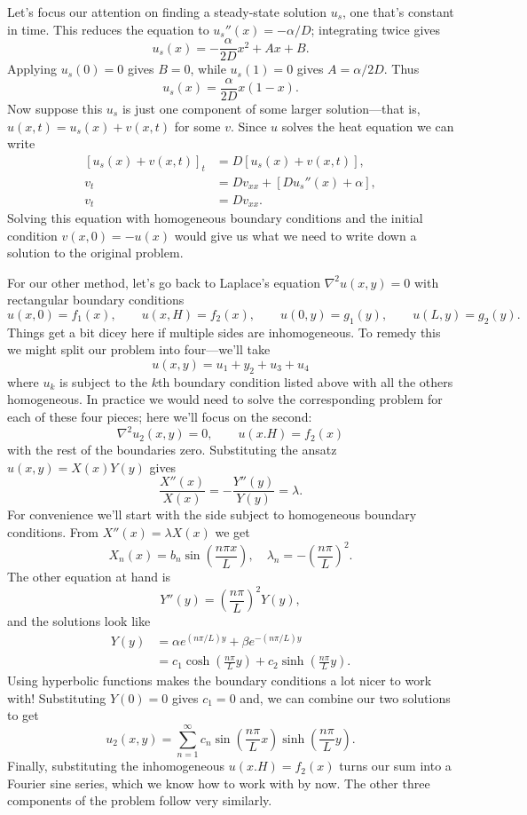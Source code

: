 \documentclass[../m180main.tex]{subfiles}
\begin{document}
Let's focus our attention on finding a steady-state solution $u_s$, one that's constant in time.
This reduces the equation to $u_s''(x) = -\alpha / D$; integrating twice gives
\[ u_s(x) = -\frac{\alpha}{2D} x^2 + Ax + B. \]
Applying $u_s(0) = 0$ gives $B = 0$, while $u_s(1) = 0$ gives $A = \alpha / 2D$.
Thus
\[ u_s(x) = \frac{\alpha}{2D} x(1-x). \]
Now suppose this $u_s$ is just one component of some larger solution---that is, $u(x,t) = u_s(x) + v(x,t)$ for some $v$.
Since $u$ solves the heat equation we can write
\begin{align*}
    \left[ u_s(x) + v(x,t) \right]_t &= D \left[ u_s(x) + v(x,t) \right], \\
    v_t &= D v_{xx} + \left[ D u_s''(x) + \alpha \right], \\
    v_t &= D v_{xx}.
\end{align*}
Solving this equation with homogeneous boundary conditions and the initial condition $v(x,0) = -u(x)$ would give us what we need to write down a solution to the original problem.

For our other method, let's go back to Laplace's equation $\nabla^2 u(x,y) = 0$ with rectangular boundary conditions
\[ u(x,0) = f_1(x), \qquad u(x,H) = f_2(x), \qquad u(0,y) = g_1(y), \qquad u(L,y) = g_2(y). \]
Things get a bit dicey here if multiple sides are inhomogeneous.
To remedy this we might split our problem into four---we'll take
\[ u(x,y) = u_1 + y_2 + u_3 + u_4 \]
where $u_k$ is subject to the $k$th boundary condition listed above with all the others homogeneous.
In practice we would need to solve the corresponding problem for each of these four pieces; here we'll focus on the second:
\[ \nabla^2 u_2(x,y) = 0, \qquad u(x.H) = f_2(x) \]
with the rest of the boundaries zero.
Substituting the ansatz $u(x,y) = X(x) Y(y)$ gives
\[ \frac{X''(x)}{X(x)} = -\frac{Y''(y)}{Y(y)} = \lambda. \]
For convenience we'll start with the side subject to homogeneous boundary conditions.
From $X''(x) = \lambda X(x)$ we get
\[ X_n(x) = b_n \sin \left( \frac{n\pi x}{L} \right), \quad \lambda_n = - \left( \frac{n\pi}{L} \right)^2. \]
The other equation at hand is
\[ Y''(y) = \left( \frac{n\pi}{L} \right)^2 Y(y), \]
and the solutions look like
\begin{align*}
    Y(y) &= \alpha e^{(n\pi / L) y} + \beta e^{-(n\pi / L) y} \\
    &= c_1 \cosh \left( \frac{n\pi}{L} y \right) + c_2 \sinh \left( \frac{n\pi}{L} y \right).
\end{align*}
Using hyperbolic functions makes the boundary conditions a lot nicer to work with!
Substituting $Y(0) = 0$ gives $c_1 = 0$ and, we can combine our two solutions to get
\[ u_2(x,y) = \sum_{n=1}^{\infty} c_n \sin \left( \frac{n\pi}{L} x \right) \sinh \left( \frac{n\pi}{L} y \right). \]
Finally, substituting the inhomogeneous $u(x.H) = f_2(x)$ turns our sum into a Fourier sine series, which we know how to work with by now.
The other three components of the problem follow very similarly.
\end{document}
